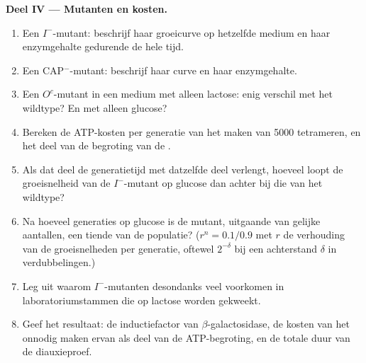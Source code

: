 \begin{problem}
\medskip
\noindent\textbf{Deel IV --- Mutanten en kosten.}
\begin{enumerate}[resume]
  \item Een $I^-$-mutant: beschrijf haar groeicurve op hetzelfde medium en
        haar enzymgehalte gedurende de hele tijd.
  \item Een CAP$^-$-mutant: beschrijf haar curve en haar enzymgehalte.
  \item Een $O^c$-mutant in een medium met alleen lactose: enig verschil
        met het wildtype? En met alleen glucose?
  \item Bereken de ATP-kosten per generatie van het maken van \num{5000}
        tetrameren, en het deel van de begroting van de .
  \item Als dat deel de generatietijd met datzelfde deel verlengt, hoeveel
        loopt de groeisnelheid van de $I^-$-mutant op glucose dan achter
        bij die van het wildtype?
  \item Na hoeveel generaties op glucose is de mutant, uitgaande van
        gelijke aantallen, een tiende van de populatie? ($r^n =
        0.1/0.9$ met $r$ de verhouding van de groeisnelheden per
        generatie, oftewel $2^{-\delta}$ bij een achterstand $\delta$ in
        verdubbelingen.)
  \item Leg uit waarom $I^-$-mutanten desondanks veel voorkomen in
        laboratoriumstammen die op lactose worden gekweekt.
  \item Geef het resultaat: de inductiefactor van
        $\beta$-galactosidase, de kosten van het onnodig maken ervan als
        deel van de ATP-begroting, en de totale duur van de
        diauxieproef.
\end{enumerate}
\end{problem}
